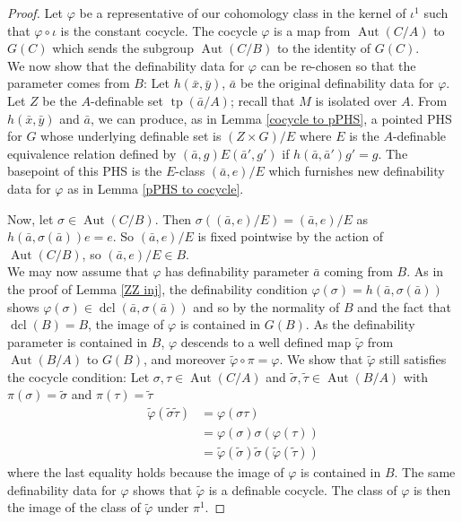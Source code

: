 \documentclass[10pt,a4paper]{amsart}
\DeclareMathOperator{\aut}{Aut} %
\DeclareMathOperator{\dcl}{dcl} %
\DeclareMathOperator{\tp}{tp} %
\begin{document}
\begin{proof}
Let $\varphi$ be a representative of our cohomology class in the kernel of $\iota^1$ such that $\varphi \circ \iota$ is the constant cocycle. The cocycle $\varphi$ is a map from $\aut(C/A)$ to $G(C)$ which sends the subgroup $\aut(C/B)$ to the identity of $G(C)$.\\

We now show that the definability data for $\varphi$ can be re-chosen so that the parameter comes from $B$: Let $h(\bar{x},\bar{y})$, $\bar{a}$ be the original definability data for $\varphi$. Let $Z$ be the $A$-definable set $\tp(\bar{a}/A)$; recall that $M$ is isolated over $A$. From $h(\bar{x},\bar{y})$ and $\bar{a}$, we can produce, as in Lemma \ref{cocycle to pPHS}, a pointed PHS for $G$ whose underlying definable set is $(Z\times G)/E$ where $E$ is the $A$-definable equivalence relation defined by $(\bar{a},g)E(\bar{a}',g')$ if $h(\bar{a},\bar{a}')g' = g$. The basepoint of this PHS is the $E$-class $(\bar{a},e)/E$ which furnishes new definability data for $\varphi$ as in Lemma \ref{pPHS to cocycle}.

Now, let $\sigma \in \aut(C/B)$. Then $\sigma((\bar{a},e)/E) = (\bar{a},e)/E$ as $h(\bar{a},\sigma(\bar{a}))e = e$. So $(\bar{a},e)/E$ is fixed pointwise by the action of $\aut(C/B)$, so $(\bar{a},e)/E \in B$.\\

We may now assume that $\varphi$ has definability parameter $\bar{a}$ coming from $B$. As in the proof of Lemma \ref{ZZ inj}, the definability condition $\varphi(\sigma) = h(\bar{a},\sigma(\bar{a}))$ shows $\varphi(\sigma) \in \dcl(\bar{a},\sigma(\bar{a}))$ and so by the normality of $B$ and the fact that $\dcl(B) = B$, the image of $\varphi$ is contained in $G(B)$. As the definability parameter is contained in $B$, $\varphi$ descends to a well defined map $\tilde{\varphi}$ from $\aut(B/A)$ to $G(B)$, and moreover $\tilde{\varphi}\circ\pi = \varphi$. We show that $\tilde{\varphi}$ still satisfies the cocycle condition: Let $\sigma,\tau \in \aut(C/A)$ and $\tilde{\sigma},\tilde{\tau} \in \aut(B/A)$ with $\pi(\sigma) = \tilde{\sigma}$ and $\pi(\tau) = \tilde{\tau}$ 
\begin{align*}
    \tilde{\varphi}(\tilde{\sigma}\tilde{\tau}) &= \varphi(\sigma\tau)\\
    &= \varphi(\sigma)\sigma(\varphi(\tau))\\
    &= \tilde{\varphi}(\tilde{\sigma})\tilde{\sigma}(\tilde{\varphi}(\tilde{\tau}))
\end{align*}
where the last equality holds because the image of $\varphi$ is contained in $B$.  The same definability data for $\varphi$ shows that $\tilde{\varphi}$ is a definable cocycle. The class of $\varphi$ is then the image of the class of $\tilde{\varphi}$ under $\pi^1$.





 



\end{proof}
\end{document}
